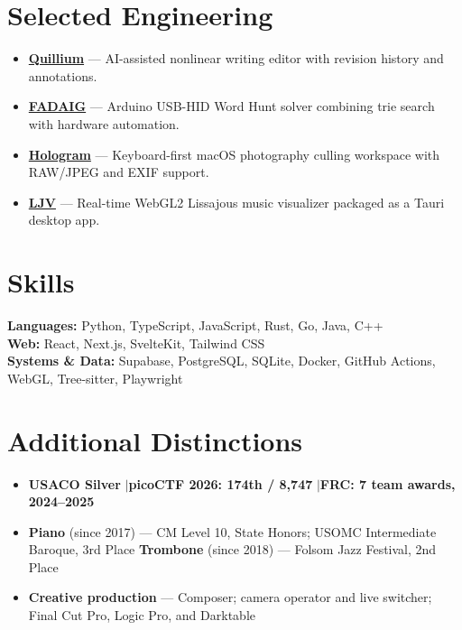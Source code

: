 \documentclass[11pt,letterpaper]{article}
\begin{document}
\section{Selected Engineering}
\begin{itemize}[leftmargin=1.2em,nosep,itemsep=1.5pt]
\item \textbf{\href{https://github.com/ThatXliner/Quillium}{Quillium}} --- AI-assisted nonlinear writing editor with revision history and annotations.
\item \textbf{\href{https://github.com/ThatXliner/FADAIG}{FADAIG}} --- Arduino USB-HID Word Hunt solver combining trie search with hardware automation.
\item \textbf{\href{https://github.com/ThatXliner/Hologram}{Hologram}} --- Keyboard-first macOS photography culling workspace with RAW/JPEG and EXIF support.
\item \textbf{\href{https://github.com/ThatXliner/ljv}{LJV}} --- Real-time WebGL2 Lissajous music visualizer packaged as a Tauri desktop app.
\end{itemize}

\section{Skills}
\textbf{Languages:} Python, TypeScript, JavaScript, Rust, Go, Java, C++ \\
\textbf{Web:} React, Next.js, SvelteKit, Tailwind CSS \\
\textbf{Systems \& Data:} Supabase, PostgreSQL, SQLite, Docker, GitHub Actions, WebGL, Tree-sitter, Playwright

\section{Additional Distinctions}
\begin{itemize}[leftmargin=1.35em,nosep,itemsep=1pt]
\item \textbf{USACO Silver} \enspace$|$\enspace \textbf{picoCTF 2026: 174th / 8,747} \enspace$|$\enspace \textbf{FRC: 7 team awards, 2024--2025}
\item \textbf{Piano} (since 2017) --- CM Level 10, State Honors; USOMC Intermediate Baroque, 3rd Place \quad
\textbf{Trombone} (since 2018) --- Folsom Jazz Festival, 2nd Place
\item \textbf{Creative production} --- Composer; camera operator and live switcher; Final Cut Pro, Logic Pro, and Darktable
\end{itemize}
\end{document}
